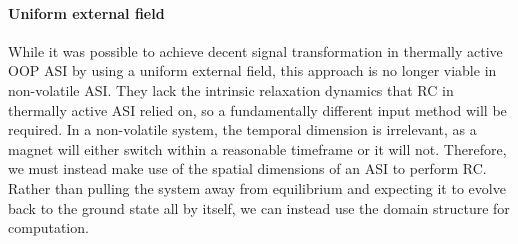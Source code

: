 \paragraph{Uniform external field}
While it was possible to achieve decent signal transformation in thermally active OOP ASI by using a uniform external field, this approach is no longer viable in non-volatile ASI.
They lack the intrinsic relaxation dynamics that RC in thermally active ASI relied on, so a fundamentally different input method will be required.
In a non-volatile system, the temporal dimension is irrelevant, as a magnet will either switch within a reasonable timeframe or it will not.
Therefore, we must instead make use of the spatial dimensions of an ASI to perform RC.
Rather than pulling the system away from equilibrium and expecting it to evolve back to the ground state all by itself, we can instead use the domain structure for computation.

